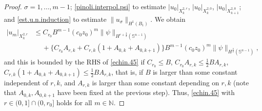 \documentclass[10pt,reqno,a4paper]{article}
\numberwithin{equation}{section}
\theoremstyle{plain}
\theoremstyle{definition}
\newcommand{\N}{{\mathbb N}}
\renewcommand{\S}{{\mathbb S}}
\begin{document}
\begin{proof}
$\sigma = 1, \ldots, m-1$;
\eqref{pinoli.interpol.psi} to estimate 
$|u_0|_{X^{2,r}_k}$, 
$|u_0|_{X^{2,0}_k}$, 
$|u_0|_{X^{2,0}_{k+1}}$; 
and \eqref{est.u.n.induction} to estimate $\| u_\sigma \|_{H^1(B_1)}$.
We obtain 
\begin{align*}
|u_m|_{X^{2,r}_k} 
& \leq C_{r_0} B^{m-1} (c_0 z_0)^{m} \| \psi \|_{H^{r+\frac32}(\S^{n-1})} 
\\ & \quad \ 
+ \{ C_{r_0} A_{r,k} + C_{r,k} (1 + A_{0,k} + A_{0,k+1}) \} 
B^{m-1} (c_0 z_0)^{m} \| \psi \|_{H^{\frac32}(\S^{n-1})},  
\end{align*}
and this is bounded by the RHS of \eqref{echin.45} if 
$C_{r_0} \leq B$, 
$C_{r_0} A_{r,k} \leq \frac12 B A_{r,k}$, 
$C_{r,k} (1 + A_{0,k} + A_{0,k+1}) \leq \frac12 B A_{r,k}$, 
that is, if $B$ is larger than some constant independent of $r,k$, 
and $A_{r,k}$ is larger than some constant depending on $r,k$
(note that $A_{0,k}, A_{0,k+1}$ have been fixed at the previous step). 
Thus, \eqref{echin.45} with $r \in (0,1] \cap (0,r_0]$ holds for all $m \in \N$. 


\end{proof}
\end{document}

